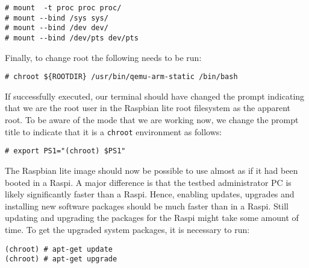 \begin{lstlisting}[]
# mount  -t proc proc proc/
# mount --bind /sys sys/
# mount --bind /dev dev/
# mount --bind /dev/pts dev/pts
\end{lstlisting}
\FloatBarrier
\vspace{-5mm}

Finally, to change root the following needs to be run:

\begin{lstlisting}[]
# chroot ${ROOTDIR} /usr/bin/qemu-arm-static /bin/bash
\end{lstlisting}
\FloatBarrier
\vspace{-5mm}


If successfully executed, our terminal should have changed the prompt
indicating that we are the root user in the Raspbian lite root filesystem as
the apparent root. To be aware of the mode that we are working now, we change
the prompt title to indicate that it is a \texttt{chroot} environment as
follows:

\begin{lstlisting}[]
# export PS1="(chroot) $PS1"
\end{lstlisting}
\FloatBarrier
\vspace{-5mm}

The Raspbian lite image should now be possible to use almost as if it had
been booted in a \ac{Raspi}. A major difference is that the testbed
administrator \ac{PC} is likely significantly faster than a \ac{Raspi}.
Hence, enabling updates, upgrades and installing new software packages
should be much faster than in a \ac{Raspi}. Still updating and upgrading
the packages for the \ac{Raspi} might take some amount of time. To get
the upgraded system packages, it is necessary to run:

\begin{lstlisting}[]
(chroot) # apt-get update
(chroot) # apt-get upgrade
\end{lstlisting}
\FloatBarrier
\vspace{-5mm}

